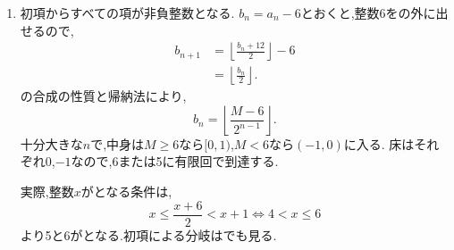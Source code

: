 \noindent {}\par\nobreak
\begin{enumerate}[label=(\arabic*),parsep=3pt,beginpenalty=10000,format=\bookitemlink{example-gauss-role-6}{solution}{problem}]
  \item 初項からすべての項が非負整数となる.
    $b_n=a_n-6$とおくと,整数6をの外に出せるので,
    \begin{align*}
      b_{n+1}
      &=\left\lfloor\frac{b_n+12}{2}\right\rfloor-6\\
      &=\left\lfloor\frac{b_n}{2}\right\rfloor.
    \end{align*}
    の合成の性質と帰納法により,
    \[
      b_n=\left\lfloor\frac{M-6}{2^{n-1}}\right\rfloor.
    \]
    十分大きな$n$で,中身は$M\ge6$なら$[0,1)$,$M<6$なら$(-1,0)$に入る.
    床はそれぞれ0,$-1$なので,6または5に有限回で到達する.

    実際,整数$x$がとなる条件は,
    \[
      x\le\frac{x+6}{2}<x+1
      \iff 4<x\le6
    \]
    より5と6がとなる.初項による分岐はでも見る.
\end{enumerate}
